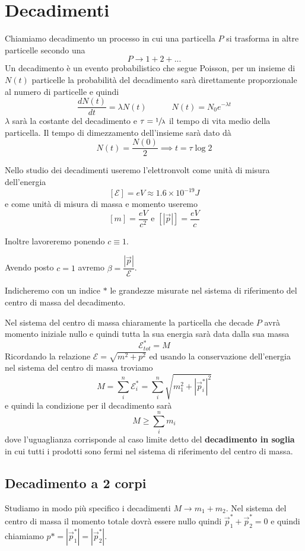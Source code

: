 \documentclass[12pt,a4paper,titlepage, twoside, openright]{book}
\numberwithin{equation}{chapter}
\begin{document}
\chapter{Decadimenti}
Chiamiamo decadimento un processo in cui una particella $P$ si trasforma in altre particelle secondo una
\[
P\rightarrow 1+2+...
\]
Un decadimento è un evento probabilistico che segue Poisson, per un insieme di $N(t)$ particelle la probabilità del decadimento sarà direttamente proporzionale al numero di particelle e quindi 
\[
\dfrac{d N(t)}{dt}=\lambda N(t) \qquad \quad N(t)=N_0e^{-\lambda t}
\]
$\lambda$ sarà la costante del decadimento e $\tau=\sfrac{1}{\lambda}$ il tempo di vita medio della particella.
Il tempo di dimezzamento dell'insieme sarà dato dà
\[
N(t)=\dfrac{N(0)}{2} \implies t=\tau\log{2}
\]

Nello studio dei decadimenti useremo l'elettronvolt come unità di misura dell'energia\[[\mathcal{E}]=eV\approx 1.6\times 10^{-19}J\] e come unità di misura di massa e momento useremo \[ [m]=\dfrac{eV}{c^2} \text{ e } [\left|\vec{p}\right|]=\dfrac{eV}{c} \]

Inoltre lavoreremo ponendo $c\equiv 1$.

Avendo posto $c=1$ avremo $\beta=\dfrac{|\vec{p}|}{\mathcal{E}}$.

Indicheremo con un indice $*$ le grandezze misurate nel sistema di riferimento del centro di massa del decadimento.

Nel sistema del centro di massa chiaramente la particella che decade $P$ avrà momento iniziale nullo e quindi tutta la sua energia sarà data dalla sua massa 
\[
\mathcal{E}^*_{tot}=M
\]
Ricordando la relazione $\mathcal{E}=\sqrt{m^2+p^2}$ ed usando la conservazione dell'energia nel sistema del centro di massa troviamo
\begin{equation}
M=\sum_i^n \mathcal{E}_i^*=\sum_i^n \sqrt{m_1^2+|\vec{p}_i^*|^2}
\end{equation}
e quindi la condizione per il decadimento sarà
\[
M\geq\sum_i^n m_i
\]
dove l'uguaglianza corrisponde al caso limite detto del \textbf{decadimento in soglia} in cui tutti i prodotti sono fermi nel sistema di riferimento del centro di massa.

\section{Decadimento a 2 corpi}

Studiamo in modo più specifico i decadimenti $M\rightarrow m_1 + m_2$.
Nel sistema del centro di massa il momento totale dovrà essere nullo quindi $\vec{p}_1^*+\vec{p}_2^*=0$ e quindi chiamiamo $p*=|\vec{p}_1^*|= |\vec{p}_2^*|$.
\end{document}
